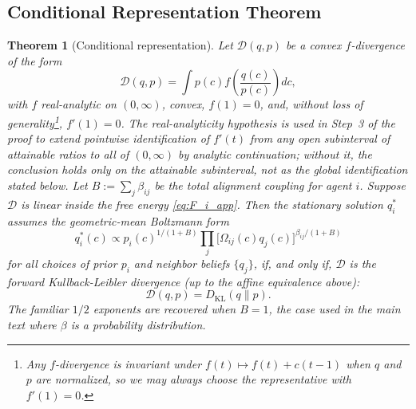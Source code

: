 \documentclass[11pt]{article}
\newtheorem{theorem}{Theorem}
\begin{document}
\subsection*{Conditional Representation Theorem}

\begin{theorem}[Conditional representation]\label{thm:representation_app}
Let\/ $\mathcal{D}(q,p)$ be a convex $f$-divergence of the form
\[
\mathcal{D}(q,p)
= \int p(c)f\left(\frac{q(c)}{p(c)}\right)dc,
\]
with $f$ \emph{real-analytic on $(0, \infty)$}, convex, $f(1)=0$, and, without loss of generality\footnote{Any $f$-divergence is invariant under $f(t)\mapsto f(t)+c(t-1)$ when $q$ and $p$ are normalized, so we may always choose the representative with $f'(1)=0$.}, $f'(1)=0$. The real-analyticity hypothesis is used in Step~3 of the proof to extend pointwise identification of $f'(t)$ from any open subinterval of attainable ratios to all of $(0, \infty)$ by analytic continuation; without it, the conclusion holds only on the attainable subinterval, not as the global identification stated below. Let $B := \sum_j \beta_{ij}$ be the total alignment coupling for agent $i$. Suppose $\mathcal{D}$ is linear inside the free energy \eqref{eq:F_i_app}. Then the stationary solution $q_i^*$ assumes the geometric-mean Boltzmann form
\begin{equation}
q_i^*(c) \propto p_i(c)^{1/(1+B)}\prod_{j}\bigl[\Omega_{ij}(c)q_j(c)\bigr]^{\beta_{ij}/(1+B)}
\label{eq:geometric_mean_target_app}
\end{equation}
for all choices of prior $p_i$ and neighbor beliefs $\{q_j\}$, if, and only if, $\mathcal{D}$ is the forward Kullback-Leibler divergence (up to the affine equivalence above):
\[
\mathcal{D}(q,p) = D_{\mathrm{KL}}(q\|p).
\]
The familiar $1/2$ exponents are recovered when $B = 1$, the case used in the main text where $\beta$ is a probability distribution.
\end{theorem}
\end{document}
